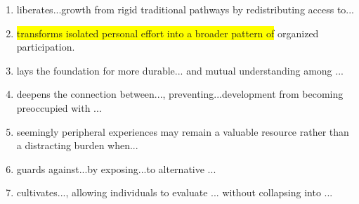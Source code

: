 ﻿\documentclass[lang=cn,11pt]{elegantbook}
\begin{document}
\begin{enumerate}
    \item liberates...growth from rigid traditional pathways by redistributing access to...
    \item \colorbox{yellow}{transforms isolated personal effort into a broader pattern of} organized participation.
    \item lays the foundation for more durable... and mutual understanding among ...
    \item deepens the connection between..., preventing...development from becoming preoccupied with ...
    
    \item seemingly peripheral experiences may remain a valuable resource rather than a distracting burden when...
    \item guards against...by exposing...to alternative ...
    \item cultivates..., allowing individuals to evaluate ... without collapsing into ...
\end{enumerate}
\end{document}
